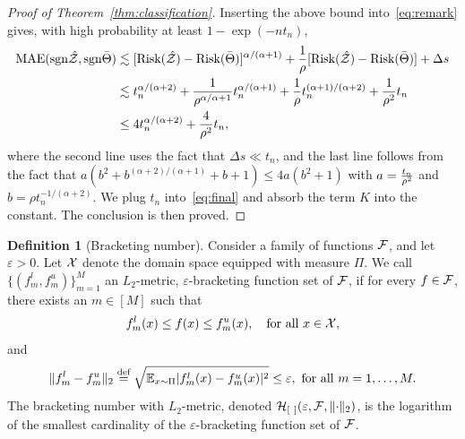 \documentclass[11pt]{article}
\theoremstyle{plain}
\theoremstyle{definition}
\newtheorem{defn}{Definition}[section]
\def\sign{\textup{sgn}}
\def\risk{\textup{Risk}}
\begin{document}
\begin{proof}[Proof of Theorem~\ref{thm:classification}]
Inserting the above bound into~\eqref{eq:remark} gives, with high probability at least $1-\exp(-nt_n)$,
\begin{align}\label{eq:final}
\textup{MAE}(\sign \hat \tZ, \sign \bar \Theta) &\lesssim [\risk(\hat \tZ)-\risk(\bar \Theta)]^{\alpha/(\alpha+1)}+{1\over \rho}[\risk(\hat \tZ)-\risk(\bar \Theta)]+\Delta s\notag \\
&\lesssim t_n^{\alpha/(\alpha+2)}+{1\over \rho^{\alpha/\alpha+1}}t_n^{\alpha/(\alpha+1)}+{1\over \rho}t_n^{(\alpha+1)/(\alpha+2)}+{1\over \rho^2}t_n\notag \\
&\leq 4t_n^{\alpha/(\alpha+2)}+{4\over \rho^2}t_n,
\end{align}
where the second line uses the fact that $\Delta s \ll t_n$, and the last line follows from the fact that $a(b^2+b^{(\alpha+2)/(\alpha+1)}+b+1) \leq 4 a (b^2+1)$ with $a={t_n \over \rho^2}$ and $b=\rho t_n^{-1/(\alpha+2)}$. We plug $t_n$ into~\eqref{eq:final} and absorb the term $K$ into the constant. The conclusion is then proved. 
\end{proof}

\begin{defn}[Bracketing number]\label{pro:inftynorm}
Consider a family of functions $\mathcal{F}$, and let $\varepsilon>0$. Let $\mathcal{X} $ denote the domain space equipped with measure $\Pi$. We call $\{(f^l_m,f^u_m)\}_{m=1}^M$ an $L_2$-metric, $\varepsilon$-bracketing function set of $\mathcal{F}$, if for every $f\in \mathcal{F}$, there exists an $m\in[M]$ such that 
\[
f^l_m(x)\leq f(x)\leq f^u_m(x),\quad \text{for all }x\in\mathcal{X},
\]
and
\[
\lVert f^l_m-f^u_m\rVert_2\stackrel{\text{def}}{=}\sqrt{\mathbb{E}_{x\sim \Pi}|f^l_m(x)-f^u_m(x)|^2} \leq \varepsilon, \ \text{for all } m=1,\ldots,M. 
\]
The bracketing number with $L_2$-metric, denoted $\mathcal{H}_{[\ ]}(\varepsilon, \mathcal{F}, \lVert\cdot\rVert_2)$, is the logarithm of the smallest cardinality of the $\varepsilon$-bracketing function set of $\mathcal{F}$.  \\
\end{defn}
\end{document}
